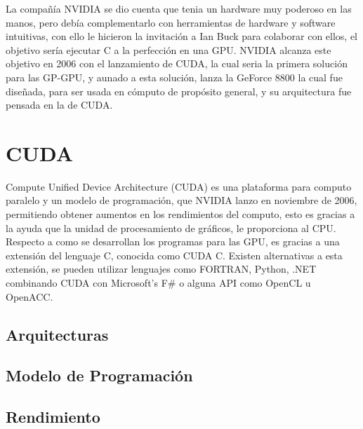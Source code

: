 La compañía NVIDIA se dio cuenta que tenia un hardware muy poderoso en las manos, pero debía complementarlo con herramientas de hardware y software intuitivas, con ello le hicieron la invitación a Ian Buck para colaborar con ellos, el objetivo sería ejecutar C a la perfección en una GPU. NVIDIA alcanza este objetivo en 2006 con el lanzamiento de CUDA, la cual seria la primera solución para las GP-GPU, y aunado a esta solución, lanza la GeForce 8800 la cual fue diseñada, para ser usada en cómputo de propósito general, y su arquitectura fue pensada en la de CUDA. 

\section{CUDA}
Compute Unified Device Architecture (CUDA) es una plataforma para computo paralelo y un modelo de programación, que NVIDIA lanzo en noviembre de 2006, permitiendo obtener aumentos en los rendimientos del computo, esto es gracias a la ayuda que la unidad de procesamiento de gráficos, le proporciona al CPU. Respecto a como se desarrollan los programas para las GPU, es gracias a una extensión del lenguaje C, conocida como CUDA C. Existen alternativas a esta extensión, se pueden utilizar lenguajes como FORTRAN, Python, .NET combinando CUDA con Microsoft's F\# o alguna API como OpenCL u OpenACC\cite{lenguajes}.

 






\subsection{Arquitecturas}


\subsection{Modelo de Programación}
\subsection{Rendimiento}

